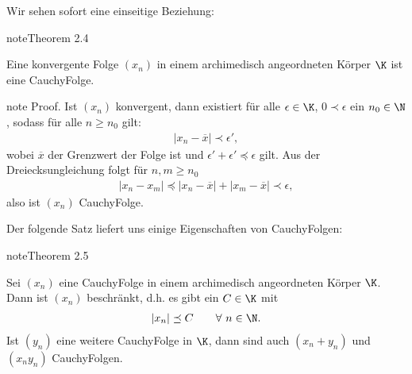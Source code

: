 \documentclass[letterpaper,10pt,english]{jupyterBook}
\begin{document}
Wir sehen sofort eine einseitige Beziehung:
\label{grundlagen/zahlensysteme:theorem-15}
\begin{sphinxadmonition}{note}{Theorem 2.4}



Eine konvergente Folge \((x_n)\) in einem archimedisch angeordneten Körper \(\K\) ist eine Cauchy\sphinxhyphen{}Folge.
\end{sphinxadmonition}

\begin{sphinxadmonition}{note}
Proof. Ist \((x_n)\) konvergent, dann existiert für alle \(\epsilon \in \K\), \(0 \prec \epsilon\) ein \(n_0 \in \N\), sodass für alle \(n \geq n_0\) gilt:
\begin{equation*}
\begin{split}| x_n - \overline{x} | \prec  \epsilon',\end{split}
\end{equation*}
wobei \(\overline{x}\) der Grenzwert der Folge ist und \(\epsilon'+\epsilon' \preceq \epsilon\) gilt. Aus der Dreiecksungleichung folgt für \(n,m \geq n_0\)
\begin{equation*}
\begin{split}| x_n - x_m | \preceq  | x_n - \overline{x} |  +  | x_m - \overline{x} | \prec \epsilon,\end{split}
\end{equation*}
also ist \((x_n)\) Cauchy\sphinxhyphen{}Folge.
\end{sphinxadmonition}

Der folgende Satz liefert uns einige Eigenschaften von Cauchy\sphinxhyphen{}Folgen:
\label{grundlagen/zahlensysteme:theorem-16}
\begin{sphinxadmonition}{note}{Theorem 2.5}



Sei \((x_n)\) eine Cauchy\sphinxhyphen{}Folge in einem archimedisch angeordneten Körper \(\K\). Dann ist \((x_n)\) beschränkt, d.h. es gibt ein \(C \in \K\) mit
\begin{equation*}
\begin{split}|x_n| \preceq C \qquad \forall~n \in \N.\end{split}
\end{equation*}
Ist \((y_n)\) eine weitere Cauchy\sphinxhyphen{}Folge in \(\K\), dann sind auch \((x_n+y_n)\) und \((x_n y_n)\) Cauchy\sphinxhyphen{}Folgen.
\end{sphinxadmonition}
\end{document}

